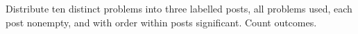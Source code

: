 Distribute ten distinct problems into three labelled posts, all problems used, each post nonempty, and with order within posts significant. Count outcomes.
